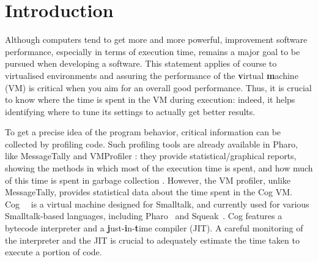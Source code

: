 \documentclass[10pt,preprint,nonatbib]{sigplanconf}
\newcommand{\ct}{\lstinline[backgroundcolor=\color{white},basicstyle=\small\ttfamily]}
\begin{document}






\section{Introduction}

%
%
%
%
%
%



Although computers tend to get more and more powerful, improvement software performance, especially in terms of execution time, remains a major goal to be pursued when developing a software. This statement applies of course to virtualised environments and assuring the performance of the \textbf{v}irtual \textbf{m}achine (VM) is critical when you aim for an overall good performance. 
Thus, it is crucial to know where the time is spent in the VM during execution: indeed, it helps identifying where to tune its settings to actually get better results.

To get a precise idea of the program behavior, critical information can be collected by profiling code.
Such profiling tools are already available in Pharo, like MessageTally \cite{Berg13a} and VMProfiler \cite{Mira08b}: they provide statistical/graphical reports, showing the methods in which most of the execution time is spent, and how much of this time is spent in garbage collection \cite{Berg13a}. However, the VM profiler, unlike MessageTally, provides statistical data about the time spent in the Cog VM. Cog~\cite{Mira08a}~ is a virtual machine designed for Smalltalk, and currently used for various Smalltalk-based languages, including Pharo~\cite{Blac09a} and Squeak~\cite{Blac07a}. Cog features a bytecode interpreter and a \textbf{j}ust-\textbf{i}n-\textbf{t}ime compiler (JIT). A careful monitoring of the interpreter and the JIT is crucial to adequately estimate the time taken to execute a portion of code.\\
\end{document}
